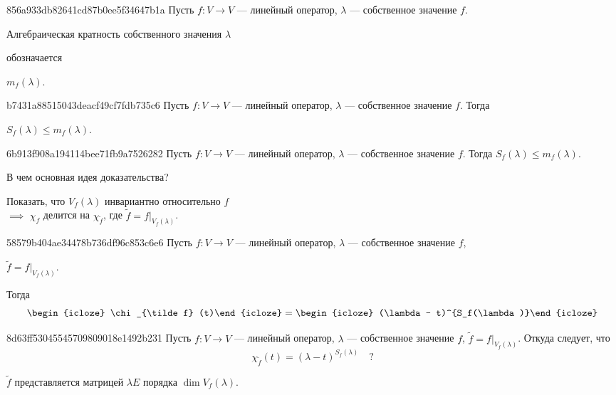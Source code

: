 \begin{note}{856a933db82641cd87b0ee5f34647b1a}
    Пусть \( f : V \to V \) --- линейный оператор, \( \lambda \) --- собственное значение \( f \).
    \begin{icloze}{2}Алгебраическая кратность собственного значения \( \lambda \)\end{icloze} обозначается \begin{icloze}{1}\( m_f (\lambda) \).\end{icloze}
\end{note}

\begin{note}{b7431a88515043deacf49cf7fdb735c6}
    Пусть \( f : V \to V \) --- линейный оператор, \( \lambda \) --- собственное значение \( f \).
    Тогда \begin{icloze}{1}\( S_f (\lambda) \leqslant m_f (\lambda) \).\end{icloze}
\end{note}

\begin{note}{6b913f908a194114bee71fb9a7526282}
    Пусть \( f : V \to V \) --- линейный оператор, \( \lambda \) --- собственное значение \( f \).
    Тогда \( S_f (\lambda) \leqslant m_f (\lambda) \).

    В чем основная идея доказательства?

    \begin{cloze}{1}
        Показать, что \( V_f (\lambda) \) инвариантно относительно \( f \) \\
        \phantom{} \hfill \( \implies \) \( \chi_f \) делится на \( \chi_{\tilde f} \), где \( \tilde f = f|_{V_f(\lambda)} \).
    \end{cloze}
\end{note}

\begin{note}{58579b404ae34478b736df96c853c6e6}
    Пусть \( f : V \to V \) --- линейный оператор, \( \lambda \) --- собственное значение \( f \), \: \begin{icloze}{2}\( \tilde f = f|_{V_f(\lambda)} \).\end{icloze}
    Тогда
    \[
        \begin{icloze}{3}\chi_{\tilde f} (t)\end{icloze} = \begin{icloze}{1}(\lambda - t)^{S_f(\lambda)}\end{icloze}
    \]
\end{note}

\begin{note}{8d63ff53045545709809018e1492b231}
    Пусть \( f : V \to V \) --- линейный оператор, \( \lambda \) --- собственное значение \( f \), \: \( \tilde f = f|_{V_f(\lambda)} \).
    Откуда следует, что
    \[
        \chi_{\tilde f} (t) = (\lambda - t)^{S_f(\lambda)} \quad?
    \]

    \begin{cloze}{1}
        \( \tilde f \) представляется  матрицей \( \lambda E \) порядка \( \dim V_f(\lambda) \).
    \end{cloze}
\end{note}

